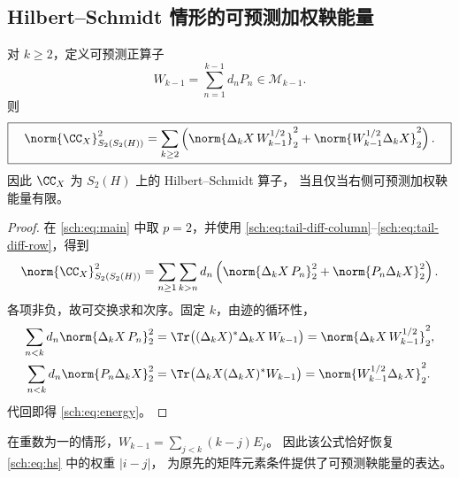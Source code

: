 \subsection{Hilbert--Schmidt 情形的可预测加权鞅能量}

\begin{corollary}[可预测加权能量公式]\label{sch:cor:energy}
对 $k\geq2$，定义可预测正算子
\[
 W_{k-1}=\sum_{n=1}^{k-1}d_nP_n\in\mathcal M_{k-1}.
\]
则
\begin{equation}\label{sch:eq:energy}
 \boxed{\quad
 \norm{\CC_X}_{S_2(S_2(H))}^2
 =\sum_{k\geq2}\left(
   \norm{\Delta_kX\,W_{k-1}^{1/2}}_2^2
  +\norm{W_{k-1}^{1/2}\Delta_kX}_2^2\right).
 \quad}
\end{equation}
因此 $\CC_X$ 为 $S_2(H)$ 上的 Hilbert--Schmidt 算子，
当且仅当右侧可预测加权鞅能量有限。
\end{corollary}

\begin{proof}
在 \eqref{sch:eq:main} 中取 $p=2$，并使用
\eqref{sch:eq:tail-diff-column}--\eqref{sch:eq:tail-diff-row}，得到
\[
 \norm{\CC_X}_{S_2(S_2(H))}^2
 =\sum_{n\geq1}\sum_{k>n}d_n\left(
   \norm{\Delta_kX\,P_n}_2^2+\norm{P_n\Delta_kX}_2^2\right).
\]
各项非负，故可交换求和次序。固定 $k$，由迹的循环性，
\begin{align*}
 \sum_{n<k}d_n\norm{\Delta_kX\,P_n}_2^2
 &=\Tr\bigl((\Delta_kX)^*\Delta_kX\,W_{k-1}\bigr)
  =\norm{\Delta_kX\,W_{k-1}^{1/2}}_2^2,\\
 \sum_{n<k}d_n\norm{P_n\Delta_kX}_2^2
 &=\Tr\bigl(\Delta_kX(\Delta_kX)^*W_{k-1}\bigr)
  =\norm{W_{k-1}^{1/2}\Delta_kX}_2^2.
\end{align*}
代回即得 \eqref{sch:eq:energy}。
\end{proof}

在重数为一的情形，$W_{k-1}=\sum_{j<k}(k-j)E_j$。
因此该公式恰好恢复 \eqref{sch:eq:hs} 中的权重 $|i-j|$，
为原先的矩阵元素条件提供了可预测鞅能量的表达。

